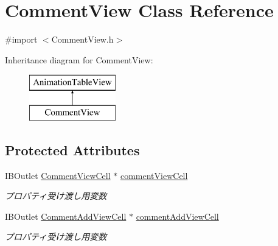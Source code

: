 \hypertarget{interface_comment_view}{
\section{CommentView Class Reference}
\label{interface_comment_view}
}


{\ttfamily \#import $<$CommentView.h$>$}

Inheritance diagram for CommentView:\begin{figure}[H]
\begin{center}
\leavevmode
\includegraphics[height=2.000000cm]{interface_comment_view}
\end{center}
\end{figure}
\subsection*{Protected Attributes}
\begin{DoxyCompactItemize}
\item 
\hypertarget{interface_comment_view_aab589da7d95d73a21552e29b95c72103}{
IBOutlet \hyperlink{interface_comment_view_cell}{CommentViewCell} $\ast$ \hyperlink{interface_comment_view_aab589da7d95d73a21552e29b95c72103}{commentViewCell}}
\label{interface_comment_view_aab589da7d95d73a21552e29b95c72103}

\begin{DoxyCompactList}\small\item\em プロパティ受け渡し用変数 \end{DoxyCompactList}\item 
\hypertarget{interface_comment_view_ac2d04bc29961b274cd89a9d7fedacf91}{
IBOutlet \hyperlink{interface_comment_add_view_cell}{CommentAddViewCell} $\ast$ \hyperlink{interface_comment_view_ac2d04bc29961b274cd89a9d7fedacf91}{commentAddViewCell}}
\label{interface_comment_view_ac2d04bc29961b274cd89a9d7fedacf91}

\begin{DoxyCompactList}\small\item\em プロパティ受け渡し用変数 \end{DoxyCompactList}\end{DoxyCompactItemize}
